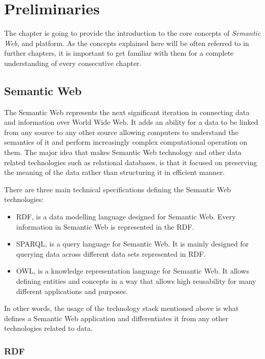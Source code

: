 \chapter{Preliminaries}
\label{chap:num_1}

The chapter is going to provide the introduction to the core concepts of \textit{Semantic Web}, \solid{} and \lpa{} platform. As the concepts explained here will be often referred to in further chapters, it is important to get familiar with them for a complete understanding of every consecutive chapter. 

\section{Semantic Web}

The Semantic Web represents the next significant iteration in connecting data and information over World Wide Web. It adds an ability for a data to be linked from any source to any other source allowing computers to understand the semantics of it and perform increasingly complex computational operation on them. The major idea that makes Semantic Web technology and other data related technologies such as relational databases, is that it focused on preserving the meaning of the data rather than structuring it in efficient manner. 

There are three main technical specifications defining the Semantic Web technologies:
\begin{itemize}
	\item \gls{RDF}, is a data modelling language designed for Semantic Web. Every information in Semantic Web is represented in the RDF.
	\item \gls{SPARQL}, is a query language for Semantic Web. It is mainly designed for querying data across different data sets represented in RDF.
	\item \gls{OWL}, is a knowledge representation language for Semantic Web. It allows defining entities and concepts in a way that allows high reusability for many different applications and purposes.
\end{itemize}  

In other words, the usage of the technology stack mentioned above is what defines a Semantic Web application and differentiates it from any other technologies related to data.

\subsection{RDF}


